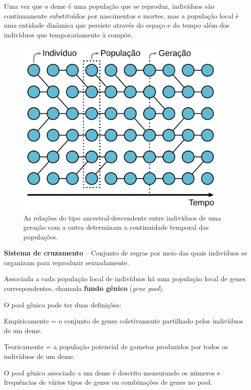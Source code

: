 \documentclass[
]{book}
\begin{document}
Uma vez que o deme é uma população que se reproduz, indivíduos são continuamente substituídos por nascimentos e mortes, mas a população local é uma entidade dinâmica que persiste através do espaço e do tempo além dos indivíduos que temporariamente à compõe.

\begin{figure}

{\centering \includegraphics[width=400px]{figs/population_relation_time} 

}

\caption{As relações do tipo ancestral-descendente entre indivíduos de uma geração com a outra determinam a continuidade temporal das populações.}\label{fig:poptime}
\end{figure}

\textbf{Sistema de cruzamento} -- Conjunto de regras por meio das quais indivíduos se organizam para reproduzir sexuadamente.

Associada a cada população local de indivíduos há uma população local de genes correspondentes, chamada \textbf{fundo gênico} (\emph{gene pool}).

O pool gênico pode ter duas definições:

Empiricamente = o conjunto de genes coletivamente partilhado pelos indivíduos de um deme.

Teoricamente = a população potencial de gametas produzidos por todos os indivíduos de um deme.

O pool gênico associado a um deme é descrito mensurando os números e frequências de vários tipos de genes ou combinações de genes no pool.
\end{document}
